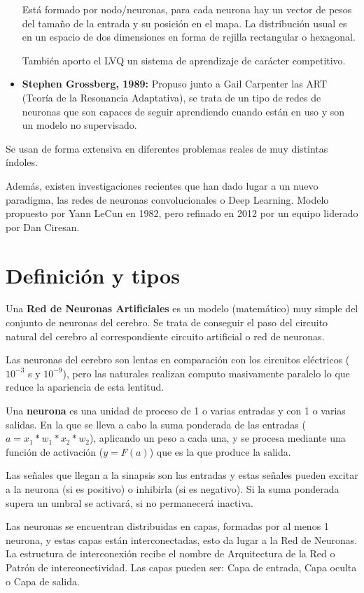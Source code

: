 \documentclass[12pt, twoside, openright]{report} %
\begin{document}
\begin{itemize}
	      Está formado por nodo/neuronas, para cada neurona hay un vector de pesos del tamaño de la entrada y su posición en el mapa. La distribución usual es en un espacio de dos dimensiones en forma de rejilla rectangular o hexagonal.

	      También aporto el LVQ un sistema de aprendizaje de carácter competitivo.
	\item \textbf{Stephen Grossberg, 1989:} Propuso junto a Gail Carpenter las ART (Teoría de la Resonancia Adaptativa), se trata de un tipo de redes de neuronas que son capaces de seguir aprendiendo cuando están en uso y son un modelo no supervisado.
\end{itemize}

Se usan de forma extensiva en diferentes problemas reales de muy distintas índoles.

Además, existen investigaciones recientes que han dado lugar a un nuevo paradigma, las redes de neuronas convolucionales o Deep Learning. Modelo propuesto por Yann LeCun en 1982, pero refinado en 2012 por un equipo liderado por Dan Ciresan.

\section{Definición y tipos}
Una \textbf{Red de Neuronas Artificiales} es un modelo (matemático) muy simple del conjunto de neuronas del cerebro. Se trata de conseguir el paso del circuito natural del cerebro al correspondiente circuito artificial o red de neuronas.

Las neuronas del cerebro son lentas en comparación con los circuitos eléctricos ($10^{-3}$ s y $10^{-9}$), pero las naturales realizan computo masivamente paralelo lo que reduce la apariencia de esta lentitud.

Una \textbf{neurona} es una unidad de proceso de 1 o varias entradas y con 1 o varias salidas. En la que se lleva a cabo la suma ponderada de las entradas ($a=x_1*w_1*x_2*w_2$), aplicando un peso a cada una, y se procesa mediante una función de activación ($y=F(a)$) que es la que produce la salida.

Las señales que llegan a la sinapsis son las entradas y estas señales pueden excitar a la neurona (si es positivo) o inhibirla (si es negativo). Si la suma ponderada supera un umbral se activará, si no permanecerá inactiva.

Las neuronas se encuentran distribuidas en capas, formadas por al menos 1 neurona, y estas capas están interconectadas, esto da lugar a la Red de Neuronas. La estructura de interconexión recibe el nombre de Arquitectura de la Red o Patrón de interconectividad. Las capas pueden ser: Capa de entrada, Capa oculta o Capa de salida.
\end{document}
